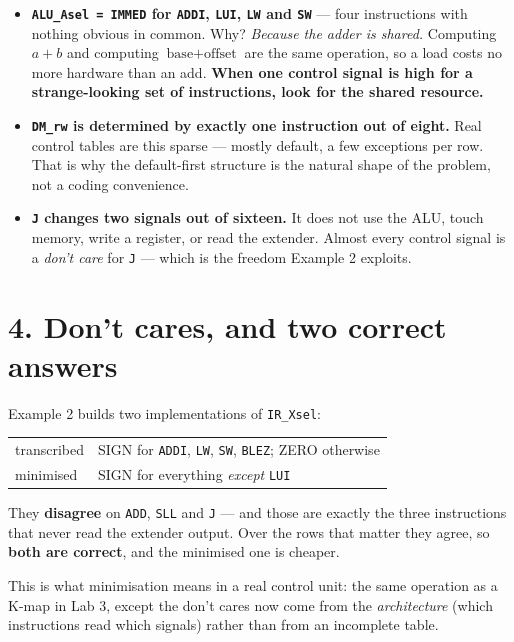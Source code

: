 \documentclass[11pt]{article}
\newcommand{\code}[1]{\texttt{#1}}
\begin{document}
\begin{itemize}[leftmargin=1.6em,itemsep=2pt]
\item \textbf{\code{ALU\_Asel = IMMED} for \code{ADDI}, \code{LUI}, \code{LW}
and \code{SW}} --- four instructions with nothing obvious in common. Why?
\emph{Because the adder is shared.} Computing $a+b$ and computing
$\text{base}+\text{offset}$ are the same operation, so a load costs no more
hardware than an add. \textbf{When one control signal is high for a strange-looking
set of instructions, look for the shared resource.}

\item \textbf{\code{DM\_rw} is determined by exactly one instruction out of
eight.} Real control tables are this sparse --- mostly default, a few exceptions
per row. That is why the default-first structure is the natural shape of the
problem, not a coding convenience.

\item \textbf{\code{J} changes two signals out of sixteen.} It does not use the
ALU, touch memory, write a register, or read the extender. Almost every control
signal is a \emph{don't care} for \code{J} --- which is the freedom Example 2
exploits.
\end{itemize}

\section*{4. Don't cares, and two correct answers}

Example 2 builds two implementations of \code{IR\_Xsel}:

\begin{center}
\begin{tabular}{ll}
\toprule
transcribed & SIGN for \code{ADDI}, \code{LW}, \code{SW}, \code{BLEZ}; ZERO otherwise \\
minimised & SIGN for everything \emph{except} \code{LUI} \\
\bottomrule
\end{tabular}
\end{center}

They \textbf{disagree} on \code{ADD}, \code{SLL} and \code{J} --- and those are
exactly the three instructions that never read the extender output. Over the
rows that matter they agree, so \textbf{both are correct}, and the minimised one
is cheaper.

This is what minimisation means in a real control unit: the same operation as a
K-map in Lab 3, except the don't cares now come from the \emph{architecture}
(which instructions read which signals) rather than from an incomplete table.
\end{document}

